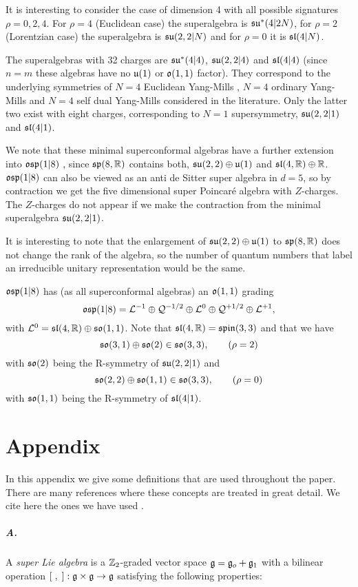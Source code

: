\documentclass[a4paper,12pt]{article}
\begin{document}
It is interesting to consider the case of dimension 4 with all
possible signatures $\rho=0,2,4$. For $\rho=4$ (Euclidean case)
the superalgebra is $\mathfrak{su}^*(4|2N)$, for $\rho=2$ (Lorentzian case)
the superalgebra is $\mathfrak{su}(2,2|N)$ and for $\rho=0$ it is
$\mathfrak{sl}(4|N)$.

The superalgebras with 32 charges are $\mathfrak{su}^*(4|4)$, $\mathfrak{su}(2,2|4)$
and $\mathfrak{sl}(4|4)$ (since $n=m$ these algebras have no $\mathfrak{u}(1)$ or
$\mathfrak{o}(1,1)$ factor). They correspond to the underlying symmetries
of $N=4$ Euclidean Yang-Mills \cite{mc,bvv}, $N=4$ ordinary
Yang-Mills and $N=4$ self dual Yang-Mills \cite{si} considered in
the literature. Only the latter two exist with eight charges,
corresponding to $N=1$ supersymmetry, $\mathfrak{su}(2,2|1)$ and
$\mathfrak{sl}(4|1)$.

We note that these minimal superconformal algebras have a further
extension into $\mathfrak{osp}(1|8)$ \cite{dflv,vv}, since $\mathfrak{sp}(8,\mathbb{R})$
contains both, $\mathfrak{su}(2,2)\oplus\mathfrak{u}(1)$ and $\mathfrak{sl}(4,\mathbb{R})\oplus\mathbb{R}$.
$\mathfrak{osp}(1|8)$ can also be viewed as an anti de Sitter super algebra
in $d=5$, so by contraction we get the five dimensional super
Poincar\'e algebra with $Z$-charges. The $Z$-charges do not appear
if we make the contraction from the minimal superalgebra
$\mathfrak{su}(2,2|1)$.

It is interesting to note that the enlargement of
$\mathfrak{su}(2,2)\oplus\mathfrak{u}(1)$ to $\mathfrak{sp}(8,\mathbb{R})$ does not change the rank
of the algebra, so the number of  quantum numbers that label an
irreducible unitary representation would be the same.

$\mathfrak{osp}(1|8)$ has (as all superconformal algebras) an $\mathfrak{o}(1,1)$
grading
$$\mathfrak{osp}(1|8)=\mathcal{L}^{-1}\oplus\mathcal{Q}^{-1/2}\oplus\mathcal{L}^{0}\oplus\mathcal{Q}^{+1/2}\oplus\mathcal{L}^{+1},$$
with $\mathcal{L}^0=\mathfrak{sl}(4,\mathbb{R})\oplus\mathfrak{so}(1,1)$. Note that
$\mathfrak{sl}(4,\mathbb{R})=\mathfrak{spin}(3,3)$ and that we have
$$\mathfrak{so}(3,1)\oplus\mathfrak{so}(2)\in \mathfrak{so}(3,3), \qquad (\rho=2)$$ with
$\mathfrak{so}(2)$ being the R-symmetry of $\mathfrak{su}(2,2|1)$ and
$$\mathfrak{so}(2,2)\oplus\mathfrak{so}(1,1)\in \mathfrak{so}(3,3), \qquad (\rho=0)$$ with
$\mathfrak{so}(1,1)$ being the R-symmetry of $\mathfrak{sl}(4|1)$.

\section*{Appendix}
In this appendix we give some definitions that are used throughout
the paper. There are many references where these concepts are
treated in great detail. We cite here the ones we have used
\cite{be,ko,ka,le}.

\subparagraph{A.} A {\it super Lie algebra} is a $\mathbb{Z}_2$-graded
vector space $\mathfrak{g}=\mathfrak{g}_o+\mathfrak{g}_1$ with a bilinear operation
$[\;,\;]:\mathfrak{g}\times\mathfrak{g}\rightarrow\mathfrak{g}$ satisfying the following
properties:
\end{document}
